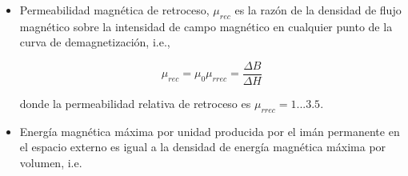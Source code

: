 \documentclass[12pt]{book}
\theoremstyle{definition}
\theoremstyle{remark}
\theoremstyle{plain}
\begin{document}
\begin{itemize}
\item Permeabilidad magnética de retroceso, $\mu_{rec}$ es la razón de la densidad de flujo magnético sobre la intensidad de campo magnético en cualquier punto de la curva de demagnetización, i.e.,

\begin{equation}
\label{equ304}
\mu _{rec} = \mu _0 \mu_{rrec}= \frac{\Delta B}{\Delta H}
\end{equation}

donde la permeabilidad relativa de retroceso es $\mu _{rrec}=1...3.5$.

\item Energía magnética máxima por unidad producida por el imán permanente en el espacio externo es igual a  la densidad de energía magnética máxima por volumen, i.e.



\end{itemize} 




 



\backmatter
\end{document}
